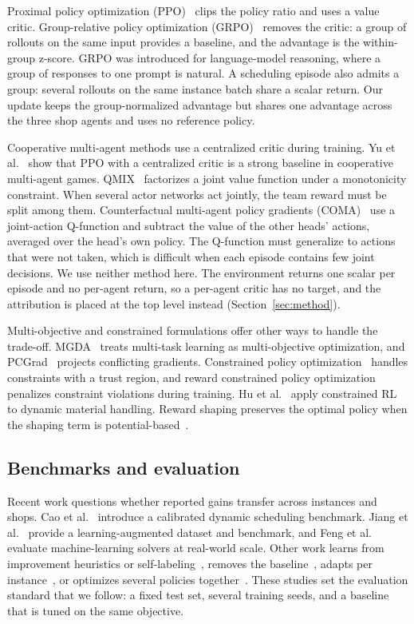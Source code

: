 Proximal policy optimization (PPO)~\cite{schulman2017ppo} clips the policy
ratio and uses a value critic. Group-relative policy optimization
(GRPO)~\cite{shao2024grpo} removes the critic: a group of rollouts on the
same input provides a baseline, and the advantage is the within-group
z-score. GRPO was introduced for language-model reasoning, where a group of
responses to one prompt is natural. A scheduling episode also admits a
group: several rollouts on the same instance batch share a scalar return. Our
update keeps the group-normalized advantage but shares one advantage across
the three shop agents and uses no reference policy.

Cooperative multi-agent methods use a centralized critic during training.
Yu et al.~\cite{yu2022mappo} show that PPO with a centralized critic is a
strong baseline in cooperative multi-agent games. QMIX~\cite{rashid2018qmix}
factorizes a joint value function under a monotonicity constraint. When
several actor networks act jointly, the team reward must be split among them.
Counterfactual multi-agent policy gradients (COMA)~\cite{foerster2018coma}
use a joint-action Q-function and subtract the value of the other heads'
actions, averaged over the head's own policy. The Q-function must generalize
to actions that were not taken, which is difficult when each episode
contains few joint decisions. We use neither method here. The environment
returns one scalar per episode and no per-agent return, so a per-agent critic
has no target, and the attribution is placed at the top level instead
(Section~\ref{sec:method}).

Multi-objective and constrained formulations offer other ways to handle the
trade-off. MGDA~\cite{sener2018mgda} treats multi-task learning as
multi-objective optimization, and PCGrad~\cite{yu2020pcgrad} projects
conflicting gradients. Constrained policy
optimization~\cite{achiam2017cpo} handles constraints with a trust region,
and reward constrained policy optimization~\cite{tessler2019rcpo} penalizes
constraint violations during training. Hu et al.~\cite{hu2023constrained}
apply constrained RL to dynamic material handling. Reward shaping preserves
the optimal policy when the shaping term is potential-based~\cite{ng1999shaping}.

\subsection{Benchmarks and evaluation}

Recent work questions whether reported gains transfer across instances and
shops. Cao et al.~\cite{cao2026dynaschedbench} introduce a calibrated dynamic
scheduling benchmark. Jiang et al.~\cite{jiang2026atlas} provide a
learning-augmented dataset and benchmark, and Feng et
al.~\cite{feng2026frontierco} evaluate machine-learning solvers at
real-world scale. Other work learns from improvement heuristics or
self-labeling~\cite{zhang2024improvement,corsini2024selflabeling}, removes
the baseline~\cite{sepulveda2026baselinefree}, adapts per
instance~\cite{qing2026instancewise}, or optimizes several policies
together~\cite{choi2025multipolicy}. These studies set the evaluation
standard that we follow: a fixed test set, several training seeds, and a
baseline that is tuned on the same objective.

